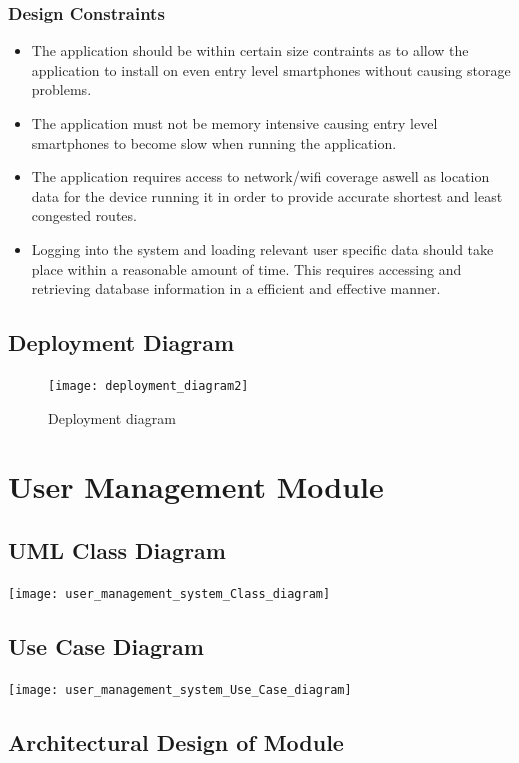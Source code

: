\documentclass{article}
\begin{document}
\subsubsection{Design Constraints}
\begin{itemize}
	\item The application should be within certain size contraints as to allow the application to 				install on even entry level smartphones without causing storage problems.
    \item The application must not be memory intensive causing entry level smartphones to become slow 			when running the application.
    \item The application requires access to network/wifi coverage aswell as location data for the 				device running it in order to provide accurate shortest and least congested routes.
    \item Logging into the system and loading relevant user specific data should take place within a 				reasonable amount of time. This requires accessing and retrieving database information in a 			efficient and effective manner.
\end{itemize}

\pagebreak
\subsection{Deployment Diagram}

\pagebreak
\begin{figure}
\texttt{[image: deployment\_diagram2]}
\caption{Deployment diagram}
\end{figure}

\section{User Management Module}

\subsection{UML Class Diagram}
\texttt{[image: user\_management\_system\_Class\_diagram]}


\subsection{Use Case Diagram}

\texttt{[image: user\_management\_system\_Use\_Case\_diagram]}

\subsection{Architectural Design of Module}
\end{document}
